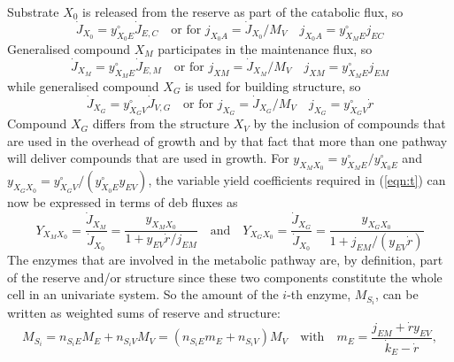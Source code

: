 Substrate $X_0$ is released from the reserve as part of the catabolic flux, so 
\begin{equation}\label{eqn:jX0}
  \dot{J}_{X_0} = y_{X_0E}^\circ \dot{J}_{E,C} 
    \quad \mbox{or for } j_{X_0A} = \dot{J}_{X_0}/ M_V \quad
  j_{X_0A} = y_{X_M E}^\circ j_{EC}
\end{equation}
Generalised compound $X_M$ participates in the maintenance flux, so 
\begin{equation}\label{eqn:jXM}
  \dot{J}_{X_M} = y_{X_M E}^\circ \dot{J}_{E,M} 
    \quad \mbox{or for } j_{XM} = \dot{J}_{X_M}/ M_V \quad
  j_{XM} = y_{X_M E}^\circ j_{EM}
\end{equation}
while generalised compound $X_G$ is used for building structure, so 
\begin{equation}\label{eqn:jXG}
 \dot{J}_{X_G} = y_{X_G V}^\circ \dot{J}_{V,G} 
   \quad \mbox{or for } j_{X_G} = \dot{J}_{X_G}/ M_V \quad
 j_{X_G} = y_{X_G V}^\circ \dot{r}
\end{equation}
Compound $X_G$ differs from the structure $X_V$ by the inclusion of compounds that are used in the overhead of growth and by that fact that more than one pathway will deliver compounds that are used in growth. 
For $y_{X_M X_0} = y_{X_M E}^\circ/ y_{X_0 E}^\circ$ and $y_{X_G X_0} = y_{X_G V}^\circ/ (y_{X_0 E}^\circ y_{EV})$, the
variable yield coefficients required in (\ref{eqn:t}) can now be expressed in terms of {\sc deb} fluxes as
\begin{equation} \label{eqn:Y}
  Y_{X_M X_0} = \frac{\dot{J}_{X_M}} {\dot{J}_{X_0}} =
     \frac{y_{X_M X_0}} {1 + y_{EV} \dot{r}/ j_{EM}}
  \quad \mbox{and} \quad
  Y_{X_G X_0} = \frac{\dot{J}_{X_G}} {\dot{J}_{X_0}} =
     \frac{y_{X_G X_0}} {1 + j_{EM}/(y_{EV} \dot{r})}
\end{equation}
The enzymes that are involved in the metabolic pathway are, by definition, part of the reserve and/or structure since these two components constitute the whole cell in an univariate system. 
So the amount of the $i$-th enzyme, $M_{S_i}$, can be written as weighted sums of reserve and structure:
\begin{equation}\label{eqn:MSi}
 M_{S_i} = n_{S_iE} M_E + n_{S_iV} M_V = 
 \left( n_{S_iE} m_E + n_{S_iV} \right) M_V \quad \mbox{with} \quad
 m_E = \frac{j_{EM} + \dot{r} y_{EV}} {\dot{k}_E - \dot{r}},
\end{equation}


